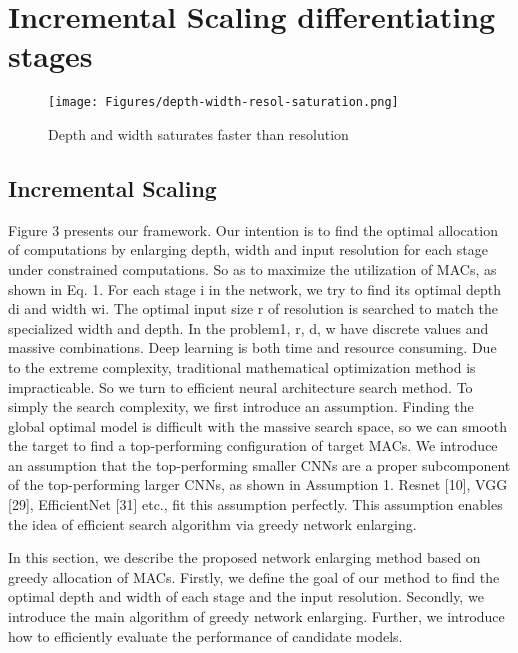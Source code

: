 

\section{Incremental Scaling differentiating stages}
\label{sec:proposed}

\begin{figure*}[t]
    \centering
     \texttt{[image: Figures/depth-width-resol-saturation.png]}
     \caption{Depth and width saturates faster than resolution}
     \label{fig:depth-width-fast-saturation}
\end{figure*}

\subsection{Incremental Scaling}
Figure 3 presents our framework. Our intention is to find the optimal allocation of computations by
enlarging depth, width and input resolution for each stage under constrained computations. So as to
maximize the utilization of MACs, as shown in Eq. 1. 
For each stage i in the network, we try to find its optimal depth di and width wi. 
The optimal input size r of resolution is searched to match the specialized width and depth.
In the problem1, r, d, w have discrete values and massive combinations.
Deep learning is both time and resource consuming.
Due to the extreme complexity, traditional mathematical optimization method is impracticable.
So we turn to efficient neural architecture search method.
To simply the search complexity, we first introduce an assumption. 
Finding the global optimal model is difficult with the massive search space, so we can smooth the target to find a top-performing configuration of target MACs. 
We introduce an assumption that the top-performing smaller CNNs are a proper subcomponent of the top-performing larger CNNs, as shown in Assumption 1. 
Resnet [10], VGG [29], EfficientNet [31] etc., fit this assumption perfectly. 
This assumption enables the idea of efficient search algorithm via greedy network enlarging.

In this section, we describe the proposed network enlarging method based on greedy allocation of MACs.
Firstly, we define the goal of our method to find the optimal depth and width of each stage and the input resolution.
Secondly, we introduce the main algorithm of greedy network enlarging.
Further, we introduce how to efficiently evaluate the performance of candidate models.


